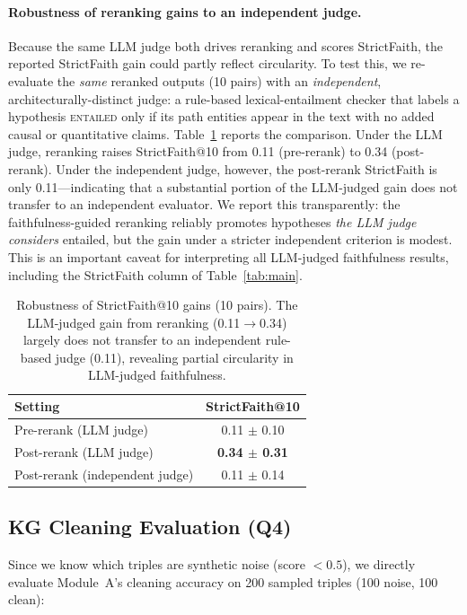 \paragraph{Robustness of reranking gains to an independent judge.}
Because the same LLM judge both drives reranking and scores StrictFaith, the reported StrictFaith gain could partly reflect circularity. To test this, we re-evaluate the \emph{same} reranked outputs (10 pairs) with an \emph{independent}, architecturally-distinct judge: a rule-based lexical-entailment checker that labels a hypothesis \textsc{entailed} only if its path entities appear in the text with no added causal or quantitative claims. Table~\ref{tab:robust} reports the comparison. Under the LLM judge, reranking raises StrictFaith@10 from 0.11 (pre-rerank) to 0.34 (post-rerank). Under the independent judge, however, the post-rerank StrictFaith is only 0.11---indicating that a substantial portion of the LLM-judged gain does not transfer to an independent evaluator. We report this transparently: the faithfulness-guided reranking reliably promotes hypotheses \emph{the LLM judge considers} entailed, but the gain under a stricter independent criterion is modest. This is an important caveat for interpreting all LLM-judged faithfulness results, including the StrictFaith column of Table~\ref{tab:main}.

\begin{table}[tb]
  \centering
  \caption{Robustness of StrictFaith@10 gains (10 pairs). The LLM-judged gain from reranking (0.11$\to$0.34) largely does not transfer to an independent rule-based judge (0.11), revealing partial circularity in LLM-judged faithfulness.}
  \label{tab:robust}
  \small
  \begin{tabular}{lc}
    \toprule
    Setting & StrictFaith@10 \\
    \midrule
    Pre-rerank (LLM judge) & 0.11 $\pm$ 0.10 \\
    Post-rerank (LLM judge) & \textbf{0.34 $\pm$ 0.31} \\
    Post-rerank (independent judge) & 0.11 $\pm$ 0.14 \\
    \bottomrule
  \end{tabular}
\end{table}

\subsection{KG Cleaning Evaluation (Q4)}
\label{sec:exp:cleaning}

Since we know which triples are synthetic noise (score $<0.5$), we directly evaluate Module~A's cleaning accuracy on 200 sampled triples (100 noise, 100 clean):

